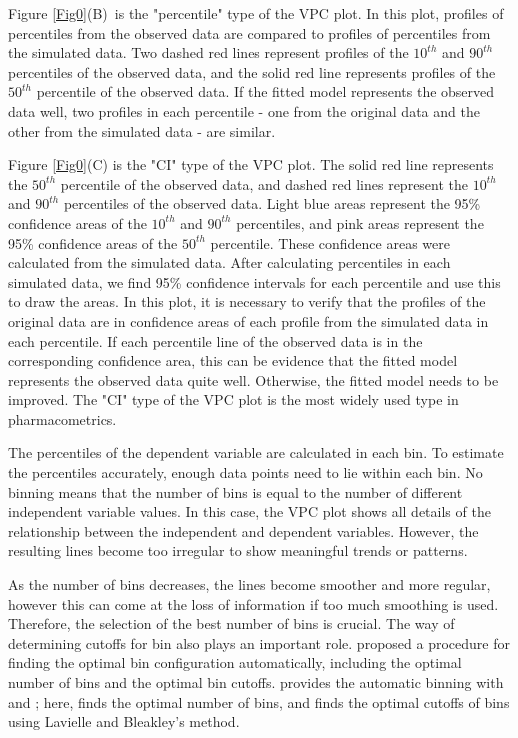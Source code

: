 Figure \ref{Fig0}(B)\ is the "percentile" type of the VPC plot. In this plot, profiles of percentiles from the observed data are compared to profiles of percentiles from the simulated data. Two dashed red lines represent profiles of the $10^{th}$ and $90^{th}$ percentiles of the observed data, and the solid red line represents profiles of the $50^{th}$ percentile of the observed data. If the fitted model represents the observed data well, two profiles in each percentile - one from the original data and the other from the simulated data - are similar.

Figure \ref{Fig0}(C) is the "CI" type of the VPC plot. The solid red line represents the $50^{th}$ percentile of the observed data, and dashed red lines represent the $10^{th}$ and $90^{th}$ percentiles of the observed data. Light blue areas represent the 95\% confidence areas of the $10^{th}$ and $90^{th}$ percentiles, and pink areas represent the 95\% confidence areas of the $50^{th}$  percentile. These confidence areas were calculated from the simulated data. After calculating percentiles in each simulated data, we find 95\% confidence intervals for each percentile and use this to draw the areas. In this plot, it is necessary to verify that the profiles of the original data are in confidence areas of each profile from the simulated data in each percentile. If each percentile line of the observed data is in the corresponding confidence area, this can be evidence
that the fitted model represents the observed data quite well. Otherwise, the fitted model needs to be improved. The "CI" type of the VPC plot is the most widely used type in pharmacometrics.

The percentiles of the dependent variable are calculated in each bin. To estimate the percentiles accurately, enough data points need to lie within each bin. No binning means that the number of bins is equal to the number of different independent variable values. In this case, the VPC plot shows all details of the relationship between the independent and dependent variables. However, the resulting lines become too irregular to show meaningful trends or patterns.

As the number of bins decreases, the lines become smoother and more regular, however this can come at the loss of information if too much smoothing is used. Therefore, the selection of the best number of bins is crucial. The way of determining cutoffs for bin also plays an important role.  \cite{lavielle2011automatic} proposed a procedure for finding the optimal bin configuration automatically, including the optimal number of bins and the optimal bin cutoffs.
 provides the automatic binning with  and ; here,  finds the optimal number of bins, and  finds the optimal cutoffs of bins using Lavielle and Bleakley's method.

